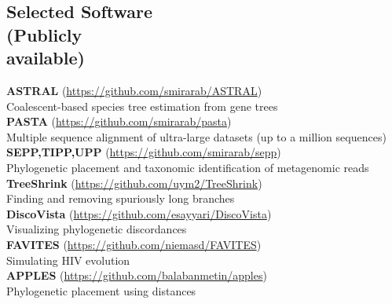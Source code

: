 \documentclass[margin,line,letterpaper]{resume}
\begin{document}
\begin{resume}
\section{\mysidestyle Selected Software\\(Publicly\\available)}
\textbf{ASTRAL} (\url{https://github.com/smirarab/ASTRAL})\\
Coalescent-based species tree estimation from  gene trees\vspace{2mm}\\
\textbf{PASTA} (\url{https://github.com/smirarab/pasta})\\ 
Multiple sequence alignment of ultra-large datasets (up to a million sequences)\vspace{2mm}\\
\textbf{SEPP,TIPP,UPP} (\url{https://github.com/smirarab/sepp})\\
Phylogenetic placement and taxonomic identification of metagenomic reads\vspace{2mm}\\
\textbf{TreeShrink} (\url{https://github.com/uym2/TreeShrink})\\
Finding and removing spuriously long branches\vspace{2mm}\\
\textbf{DiscoVista} (\url{https://github.com/esayyari/DiscoVista})\\
Visualizing phylogenetic discordances\vspace{2mm}\\
\textbf{FAVITES} (\url{https://github.com/niemasd/FAVITES})\\
Simulating HIV evolution\vspace{2mm}\\
\textbf{APPLES} (\url{https://github.com/balabanmetin/apples})\\
Phylogenetic placement using distances \vspace{2mm}\\

\end{resume}
\end{document}
